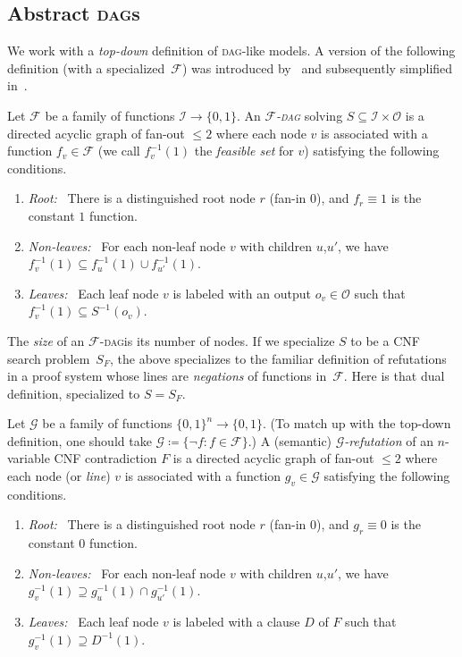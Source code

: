 \documentclass{toc}
\newcommand{\DAG}{\textsc{dag}}
\newcommand{\DAGs}{\textsc{dag}s\xspace}
\newcommand{\calI}{\mathcal{I}}
\newcommand{\calO}{\mathcal{O}}
\newcommand{\calF}{\mathcal{F}}
\newcommand{\calG}{\mathcal{G}}
\begin{document}
\subsection{Abstract \DAGs} \label{sec:defs}
We work with a \emph{top-down} definition of \DAG-like models. A version of the following definition (with a specialized~$\calF$) was introduced by~\cite{razborov95unprovability} and subsequently simplified in~\cite{pudlak10extracting,sokolov17dag}.
\begin{top-down}
Let $\calF$ be a family of functions $\calI\to\{0,1\}$. An \emph{$\calF$-\DAG} solving $S\subseteq \calI\times\calO$ is a directed acyclic graph of fan-out $\leq 2$ where each node $v$ is associated with a function $f_v\in\calF$ (we call $f^{-1}_v(1)$ the \emph{feasible set} for $v$) satisfying the 
%
following conditions.  %
\begin{enumerate}
\item \emph{Root:}~ There is a distinguished root node $r$ (fan-in 0), and $f_r\equiv 1$ is the constant $1$ function.
\item \emph{Non-leaves:}~ For each non-leaf node $v$ with children $u$,$u'$, we have $f^{-1}_v(1)\subseteq f^{-1}_u(1)\cup f^{-1}_{u'}(1)$.
\item \emph{Leaves:}~ Each leaf node $v$ is labeled with an output $o_v\in \calO$ such that $f_v^{-1}(1)\subseteq S^{-1}(o_v)$.
\end{enumerate}
\end{top-down}

The \emph{size} of an $\calF$-\DAG is its number of nodes. If we specialize $S$ to be a CNF search problem~$S_F$, the above specializes to the familiar definition of refutations in a proof system whose lines are \emph{negations} of functions in~$\calF$. Here is that dual definition, specialized to $S=S_F$.
\begin{bottom-up}
Let $\calG$ be a family of functions $\{0,1\}^n\to\{0,1\}$. (To match up with the top-down definition, one should take $\calG\coloneqq\{\neg f : f\in \calF\}$.) A (semantic) \emph{$\calG$-refutation} of an $n$-variable CNF contradiction $F$ is a directed acyclic graph of fan-out $\leq 2$ where each node (or \emph{line}) $v$ is associated with a function $g_v\in\calG$ satisfying the 
%
following conditions.  %
\begin{enumerate}
\item \emph{Root:}~ There is a distinguished root node $r$ (fan-in 0), and $g_r\equiv 0$ is the constant $0$ function.
\item \emph{Non-leaves:}~ For each non-leaf node $v$ with children $u$,$u'$, we have $g^{-1}_v(1)\supseteq g^{-1}_u(1)\cap g^{-1}_{u'}(1)$.
\item \emph{Leaves:}~ Each leaf node $v$ is labeled with a clause $D$ of $F$ such that $g_v^{-1}(1)\supseteq D^{-1}(1)$.
\end{enumerate}
\end{bottom-up}
\end{document}
